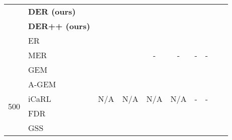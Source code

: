 \documentclass{article}
\begin{document}
\begin{table}[H]
{{\begin{tabular}{clcccccccc}
                        & \textbf{DER (ours)}   & \tiny{}                          &  \tiny{} & \tiny{}                          &  \tiny{}                           &  \tiny{}                           & \tiny{} \\
                        & \textbf{DER++ (ours)} & \tiny{}                          & \tiny{}                           &  \tiny{}&  \tiny{}                           &  \tiny{}                           & \tiny{} \\
\midrule                            
                        & ER                    & \tiny{}                          &  \tiny{}                           &  \tiny{}                          & \tiny{}                           &  \tiny{}                           & \tiny{} \\
                        & MER                   & \tiny{}                          &  \tiny{}                           & -                                                 & -                                                 & -                                                 & -                       \\
                        & GEM                   & \tiny{}                          &  \tiny{}                           & \tiny{}                          &  \tiny{}                           &  \tiny{}                           & \tiny{} \\
                        & A-GEM                 &  \tiny{}                          &  \tiny{}                           &  \tiny{}                          &  \tiny{} &  \tiny{}                           & \tiny{} \\
\multirow{2}{*}{500}    & iCaRL                 & N/A                                               & N/A                                               & N/A                                               & N/A                                               & -                                                 & -                       \\
                        & FDR                   &  \tiny{}                          &  \tiny{}                           &  \tiny{}&  \tiny{}                           & \tiny{}                           & \tiny{} \\
                        & GSS                   & \tiny{}                          &  \tiny{}                           &  \tiny{}                          &  \tiny{}                           &  \tiny{} & \tiny{} \\

\end{tabular}}}
\end{table}
\end{document}
